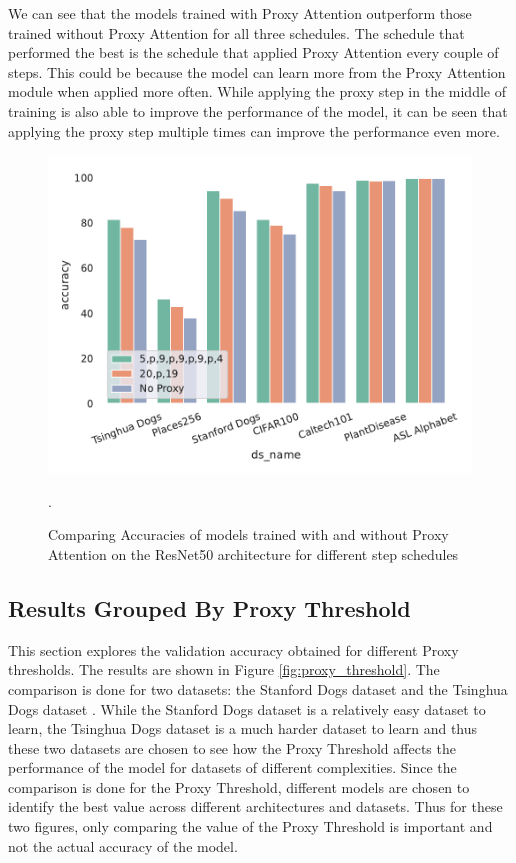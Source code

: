 \documentclass[a4paper,11pt,openright]{book}
\begin{document}
We can see that the models trained with Proxy Attention outperform those trained without Proxy Attention for all three schedules. The schedule that performed the best is the schedule that applied Proxy Attention every couple of steps. This could be because the model can learn more from the Proxy Attention module when applied more often. While applying the proxy step in the middle of training is also able to improve the performance of the model, it can be seen that applying the proxy step multiple times can improve the performance even more.
\begin{figure}[!htb]
    \centering
    \includegraphics[width=.6\textwidth]{results/schedule_resnet50.pdf}
    \caption{Comparing Accuracies of models trained with and without Proxy Attention on the ResNet50 \cite{heDeepResidualLearning2016} architecture for different step schedules}.
    \label{fig:schedresnet50_results}
\end{figure}
\subsection{Results Grouped By Proxy Threshold}
This section explores the validation accuracy obtained for different Proxy thresholds. The results are shown in Figure \ref{fig:proxy_threshold}. 
The comparison is done for two datasets: the Stanford Dogs dataset \cite{khoslaNovelDatasetFineGrained} and the Tsinghua Dogs dataset \cite{zouNewDatasetDog2020}. While the Stanford Dogs dataset is a relatively easy dataset to learn, the Tsinghua Dogs dataset is a much harder dataset to learn and thus these two datasets are chosen to see how the Proxy Threshold affects the performance of the model for datasets of different complexities. Since the comparison is done for the Proxy Threshold, different models are chosen to identify the best value across different architectures and datasets. Thus for these two figures, only comparing the value of the Proxy Threshold is important and not the actual accuracy of the model.
\end{document}
